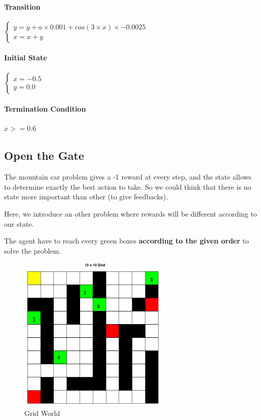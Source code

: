 \documentclass[a4paper,12pt]{article}
\begin{document}
    \paragraph{Transition}
     $ \left\lbrace \begin{array}{lll} 
      y = y + a \times 0.001+cos(3 \times x) \times -0.0025\\
      x = x + y
      \end{array} \right.$

    \paragraph{Initial State}
         $ \left\lbrace \begin{array}{lll} 
      x = -0.5\\
      y = 0.0 
      \end{array} \right.$
    
    \paragraph{Termination Condition}
    $x >= 0.6$
    
    
    \newpage
    \subsection{Open the Gate}

The mountain car problem gives a -1 reward at every step, and the state allows to 
    determine exactly the best action to take. So we could think that there is no state more important than other (to give feedbacks). 

Here, we introduce an other problem where rewards will be different according to our state.
    
    The agent have to reach every green boxes \textbf{according to the given order} to solve the problem.
    

    \begin{figure}[H]
      \begin{center}
	\includegraphics[width=270px]{gridworld}
	\caption{ Grid World }
	\end{center}
    \end{figure}
    
\end{document}
